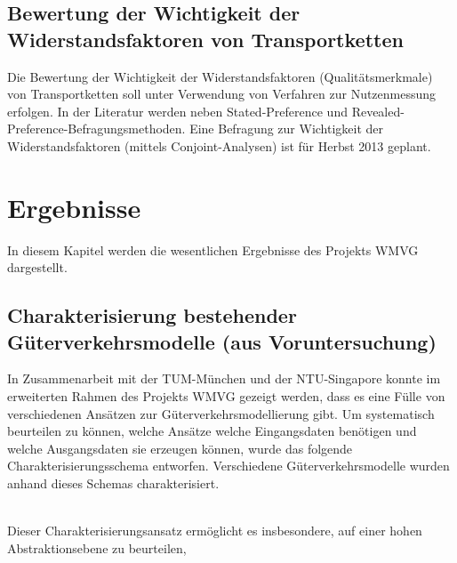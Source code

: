 % 
\subsection{Bewertung der Wichtigkeit der Widerstandsfaktoren von Transportketten}
\label{_Toc366766104}
\label{_Toc366775298}
Die Bewertung der Wichtigkeit der Widerstandsfaktoren (Qualitätsmerkmale) von Transportketten soll unter Verwendung von Verfahren zur Nutzenmessung erfolgen. In der Literatur werden neben Stated-Preference und Revealed-Preference-Befragungsmethoden. Eine Befragung zur Wichtigkeit der Widerstandsfaktoren (mittels Conjoint-Analysen) ist für Herbst 2013 geplant.~\\


% 
\section{Ergebnisse}
\label{_Ref361848137}
\label{_Toc363572036}
\label{_Toc363601742}
\label{_Toc365801603}
\label{_Toc366766105}
\label{_Toc366775299}
In diesem Kapitel werden die wesentlichen Ergebnisse des Projekts WMVG dargestellt.~\\


% 
\subsection{Charakterisierung bestehender Güterverkehrsmodelle (aus Voruntersuchung)}
\label{_Ref364935071}
\label{_Toc364945132}
\label{_Toc365801604}
\label{_Toc366766106}
\label{_Toc366775300}
In Zusammenarbeit mit der TUM-München und der NTU-Singapore konnte im erweiterten Rahmen des Projekts WMVG gezeigt werden, dass es eine Fülle von verschiedenen Ansätzen zur Güterverkehrsmodellierung gibt. Um systematisch beurteilen zu können, welche Ansätze welche Eingangsdaten benötigen und welche Ausgangsdaten sie erzeugen können, wurde das folgende Charakterisierungsschema entworfen. Verschiedene Güterverkehrsmodelle wurden anhand dieses Schemas charakterisiert. ~\\

\begin{figure}[htbp]
  \centering
  \caption{}
  \label{}
\end{figure}
~\\
Dieser Charakterisierungsansatz ermöglicht es insbesondere, auf einer hohen Abstraktionsebene zu beurteilen, ~\\

